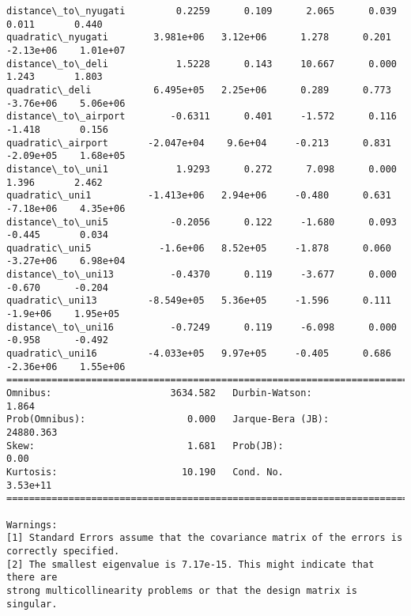 \documentclass[11pt]{article}
\begin{document}
\begin{Verbatim}[commandchars=\\\{\}]
distance\_to\_nyugati         0.2259      0.109      2.065      0.039       0.011       0.440
quadratic\_nyugati        3.981e+06   3.12e+06      1.278      0.201   -2.13e+06    1.01e+07
distance\_to\_deli            1.5228      0.143     10.667      0.000       1.243       1.803
quadratic\_deli           6.495e+05   2.25e+06      0.289      0.773   -3.76e+06    5.06e+06
distance\_to\_airport        -0.6311      0.401     -1.572      0.116      -1.418       0.156
quadratic\_airport       -2.047e+04    9.6e+04     -0.213      0.831   -2.09e+05    1.68e+05
distance\_to\_uni1            1.9293      0.272      7.098      0.000       1.396       2.462
quadratic\_uni1          -1.413e+06   2.94e+06     -0.480      0.631   -7.18e+06    4.35e+06
distance\_to\_uni5           -0.2056      0.122     -1.680      0.093      -0.445       0.034
quadratic\_uni5            -1.6e+06   8.52e+05     -1.878      0.060   -3.27e+06    6.98e+04
distance\_to\_uni13          -0.4370      0.119     -3.677      0.000      -0.670      -0.204
quadratic\_uni13         -8.549e+05   5.36e+05     -1.596      0.111    -1.9e+06    1.95e+05
distance\_to\_uni16          -0.7249      0.119     -6.098      0.000      -0.958      -0.492
quadratic\_uni16         -4.033e+05   9.97e+05     -0.405      0.686   -2.36e+06    1.55e+06
==============================================================================
Omnibus:                     3634.582   Durbin-Watson:                   1.864
Prob(Omnibus):                  0.000   Jarque-Bera (JB):            24880.363
Skew:                           1.681   Prob(JB):                         0.00
Kurtosis:                      10.190   Cond. No.                     3.53e+11
==============================================================================

Warnings:
[1] Standard Errors assume that the covariance matrix of the errors is correctly specified.
[2] The smallest eigenvalue is 7.17e-15. This might indicate that there are
strong multicollinearity problems or that the design matrix is singular.

    \end{Verbatim}
\end{document}
